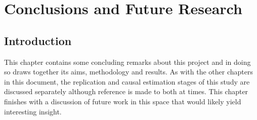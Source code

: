 %
%
%
%

\chapter{Conclusions and Future Research}\label{C.Conclusions.Future.research}

\section{Introduction}\label{S.Concl.intro}
{This chapter contains some concluding remarks about this project and in doing so draws together its aims, methodology and results. As with the other chapters in this document, the replication and causal estimation stages of this study are discussed separately although reference is made to both at times. This chapter finishes with a discussion of future work in this space that would likely yield interesting insight. }
